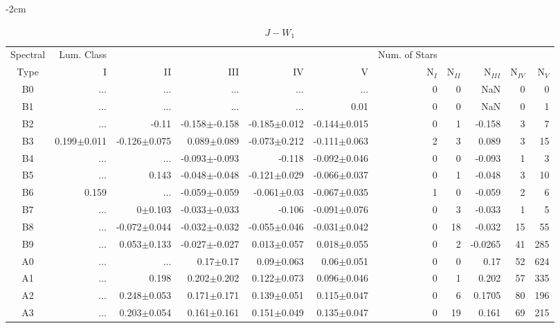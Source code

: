 \begin{table}[t]
\tiny
\centering
\caption{$J-W_{1}$}
\begin{center}
    \addtolength{\leftskip} {-2cm}
    \addtolength{\rightskip}{-2cm}
    \begin{tabular}{c|rrrrr|rrrrr}
    \toprule
    Spectral & Lum. Class & & & & & Num. of Stars & & & &  \\
    Type & I & II & III &  IV & V & N$_{I}$ & N$_{II}$ & N$_{III}$ & N$_{IV}$ & N$_{V}$ \\ \midrule
  
B0	&	 ...	&	 ...	&	 ...	&	 ...	&	 ...	&	0	&	0	&	NaN	&	0	&	0	\\
B1	&	 ...	&	 ...	&	 ...	&	 ...	&	0.01	&	0	&	0	&	NaN	&	0	&	1	\\
B2	&	 ...	&	-0.11	&	-0.158$\pm$-0.158	&	-0.185$\pm$0.012	&	-0.144$\pm$0.015	&	0	&	1	&	-0.158	&	3	&	7	\\
B3	&	0.199$\pm$0.011	&	-0.126$\pm$0.075	&	0.089$\pm$0.089	&	-0.073$\pm$0.212	&	-0.111$\pm$0.063	&	2	&	3	&	0.089	&	3	&	15	\\
B4	&	 ...	&	 ...	&	-0.093$\pm$-0.093	&	-0.118	&	-0.092$\pm$0.046	&	0	&	0	&	-0.093	&	1	&	3	\\
B5	&	 ...	&	0.143	&	-0.048$\pm$-0.048	&	-0.121$\pm$0.029	&	-0.066$\pm$0.037	&	0	&	1	&	-0.048	&	3	&	10	\\
B6	&	0.159	&	 ...	&	-0.059$\pm$-0.059	&	-0.061$\pm$0.03	&	-0.067$\pm$0.035	&	1	&	0	&	-0.059	&	2	&	6	\\
B7	&	 ...	&	0$\pm$0.103	&	-0.033$\pm$-0.033	&	-0.106	&	-0.091$\pm$0.076	&	0	&	3	&	-0.033	&	1	&	5	\\
B8	&	 ...	&	-0.072$\pm$0.044	&	-0.032$\pm$-0.032	&	-0.055$\pm$0.046	&	-0.031$\pm$0.042	&	0	&	18	&	-0.032	&	15	&	55	\\
B9	&	 ...	&	0.053$\pm$0.133	&	-0.027$\pm$-0.027	&	0.013$\pm$0.057	&	0.018$\pm$0.055	&	0	&	2	&	-0.0265	&	41	&	285	\\
A0	&	 ...	&	 ...	&	0.17$\pm$0.17	&	0.09$\pm$0.063	&	0.06$\pm$0.051	&	0	&	0	&	0.17	&	52	&	624	\\
A1	&	 ...	&	0.198	&	0.202$\pm$0.202	&	0.122$\pm$0.073	&	0.096$\pm$0.046	&	0	&	1	&	0.202	&	57	&	335	\\
A2	&	 ...	&	0.248$\pm$0.053	&	0.171$\pm$0.171	&	0.139$\pm$0.051	&	0.115$\pm$0.047	&	0	&	6	&	0.1705	&	80	&	196	\\
A3	&	 ...	&	0.203$\pm$0.054	&	0.161$\pm$0.161	&	0.151$\pm$0.049	&	0.135$\pm$0.047	&	0	&	19	&	0.161	&	69	&	215	\\

\end{tabular}
\end{center}
\end{table}
